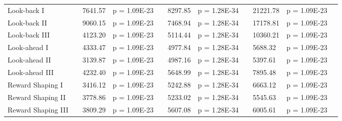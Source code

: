 \documentclass{article}
\begin{document}
\begin{appendices}
\begin{landscape}
\begin{table}[htp]
\begin{center}
\begin{tabular}{*{1}{>{\raggedright}p{14em}}*{1}{>{\raggedleft}p{4em}}*{1}{>{\raggedleft}p{5em}}*{1}{>{\raggedright}p{5em}}*{1}{>{\columncolor{mColor1}\raggedleft}p{4em}}*{1}{>{\columncolor{mColor1}\raggedleft}p{5em}}*{1}{>{\columncolor{mColor1}\raggedright}p{5em}}*{1}{>{\raggedleft}p{4em}}*{1}{>{\raggedleft}p{5em}}*{1}{>{\raggedright}p{5em}}*{1}{>{\raggedright}p{0.01em}}}
\toprule[1pt]
\addlinespace[2pt]
{\bf Method} &\multicolumn{3}{c}{\bf Delay 12} &\multicolumn{3}{c}{\bf Delay 15} &\multicolumn{3}{c}{\bf Delay 17} &\\
\toprule[1pt]
Look-back I & 33082.56 & {\small  7641.57} & {\small p = 1.09E-23} & 49658.86 & {\small  8297.85} & {\small p = 1.28E-34} & 72115.16 & {\small  21221.78} & {\small p = 1.09E-23} &  \\
Look-back II & 23240.16 & {\small  9060.15} & {\small p = 1.09E-23} & 29293.94 & {\small  7468.94} & {\small p = 1.28E-34} & 42639.38 & {\small  17178.81} & {\small p = 1.09E-23} &  \\
Look-back III & 15647.40 & {\small  4123.20} & {\small p = 1.09E-23} & 20478.06 & {\small  5114.44} & {\small p = 1.28E-34} & 26946.92 & {\small  10360.21} & {\small p = 1.09E-23} &  \\
Look-ahead I & 66769.02 & {\small  4333.47} & {\small p = 1.09E-23} & 105336.74 & {\small  4977.84} & {\small p = 1.28E-34} & 136660.12 & {\small  5688.32} & {\small p = 1.09E-23} &  \\
Look-ahead II & 62220.56 & {\small  3139.87} & {\small p = 1.09E-23} & 100505.05 & {\small  4987.16} & {\small p = 1.28E-34} & 130271.88 & {\small  5397.61} & {\small p = 1.09E-23} &  \\
Look-ahead III & 72804.44 & {\small  4232.40} & {\small p = 1.09E-23} & 115616.59 & {\small  5648.99} & {\small p = 1.28E-34} & 149064.68 & {\small  7895.48} & {\small p = 1.09E-23} &  \\
Reward Shaping I & 68428.04 & {\small  3416.12} & {\small p = 1.09E-23} & 107399.17 & {\small  5242.88} & {\small p = 1.28E-34} & 137032.14 & {\small  6663.12} & {\small p = 1.09E-23} &  \\
Reward Shaping II & 56225.24 & {\small  3778.86} & {\small p = 1.09E-23} & 93091.44 & {\small  5233.02} & {\small p = 1.28E-34} & 122224.20 & {\small  5545.63} & {\small p = 1.09E-23} &  \\
Reward Shaping III & 60071.52 & {\small  3809.29} & {\small p = 1.09E-23} & 99476.40 & {\small  5607.08} & {\small p = 1.28E-34} & 130103.50 & {\small  6005.61} & {\small p = 1.09E-23} &  \\

\end{tabular}
\end{center}
\end{table}
\end{landscape}
\end{appendices}
\end{document}
